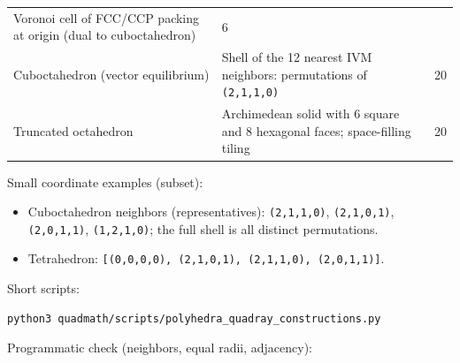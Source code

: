 \documentclass[
  10pt,
]{article}
\newcommand{\passthrough}[1]{#1}
\providecommand{\tightlist}{%
  \setlength{\itemsep}{0pt}\setlength{\parskip}{0pt}}
\begin{document}
\begin{longtable}[]{@{}lll@{}}
\begin{minipage}[t]{0.30\columnwidth}
Voronoi cell of FCC/CCP packing at origin (dual to cuboctahedron)\strut
\end{minipage} & \begin{minipage}[t]{0.30\columnwidth}\raggedright
6\strut
\end{minipage}\tabularnewline
\begin{minipage}[t]{0.30\columnwidth}\raggedright
Cuboctahedron (vector equilibrium)\strut
\end{minipage} & \begin{minipage}[t]{0.30\columnwidth}\raggedright
Shell of the 12 nearest IVM neighbors: permutations of
\passthrough{\lstinline!(2,1,1,0)!}\strut
\end{minipage} & \begin{minipage}[t]{0.30\columnwidth}\raggedright
20\strut
\end{minipage}\tabularnewline
\begin{minipage}[t]{0.30\columnwidth}\raggedright
Truncated octahedron\strut
\end{minipage} & \begin{minipage}[t]{0.30\columnwidth}\raggedright
Archimedean solid with 6 square and 8 hexagonal faces; space-filling
tiling\strut
\end{minipage} & \begin{minipage}[t]{0.30\columnwidth}\raggedright
20\strut
\end{minipage}\tabularnewline
\bottomrule
\end{longtable}

Small coordinate examples (subset):

\begin{itemize}
\tightlist
\item
  Cuboctahedron neighbors (representatives):
  \passthrough{\lstinline!(2,1,1,0)!},
  \passthrough{\lstinline!(2,1,0,1)!},
  \passthrough{\lstinline!(2,0,1,1)!},
  \passthrough{\lstinline!(1,2,1,0)!}; the full shell is all distinct
  permutations.
\item
  Tetrahedron:
  \passthrough{\lstinline![(0,0,0,0), (2,1,0,1), (2,1,1,0), (2,0,1,1)]!}.
\end{itemize}

Short scripts:

\begin{lstlisting}[language=bash]
python3 quadmath/scripts/polyhedra_quadray_constructions.py
\end{lstlisting}

Programmatic check (neighbors, equal radii, adjacency):
\end{document}
